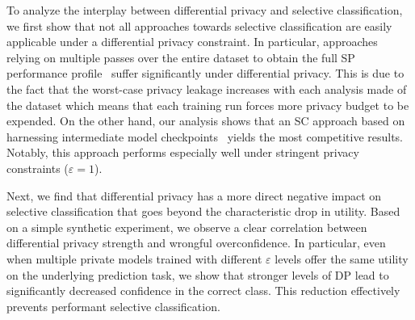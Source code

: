 
To analyze the interplay between differential privacy and selective classification, we first show that not all approaches towards selective classification are easily applicable under a differential privacy constraint. In particular, approaches relying on multiple passes over the entire dataset to obtain the full SP performance profile~\citep{geifman2019selectivenet, lakshminarayanan2017simple} suffer significantly under differential privacy. This is due to the fact that the worst-case privacy leakage increases with each analysis made of the dataset which means that each training run forces more privacy budget to be expended. On the other hand, our analysis shows that an SC approach based on harnessing intermediate model checkpoints~\citep{rabanser2022selective} yields the most competitive results. Notably, this approach performs especially well under stringent privacy constraints ($\varepsilon = 1$). 


Next, we find that differential privacy has a more direct negative impact on selective classification that goes beyond the characteristic drop in utility. Based on a simple synthetic experiment, we observe a clear correlation between differential privacy strength and wrongful overconfidence. In particular, even when multiple private models trained with different $\varepsilon$ levels offer the same utility on the underlying prediction task, we show that stronger levels of DP lead to significantly decreased confidence in the correct class. This reduction effectively prevents performant selective classification. 

